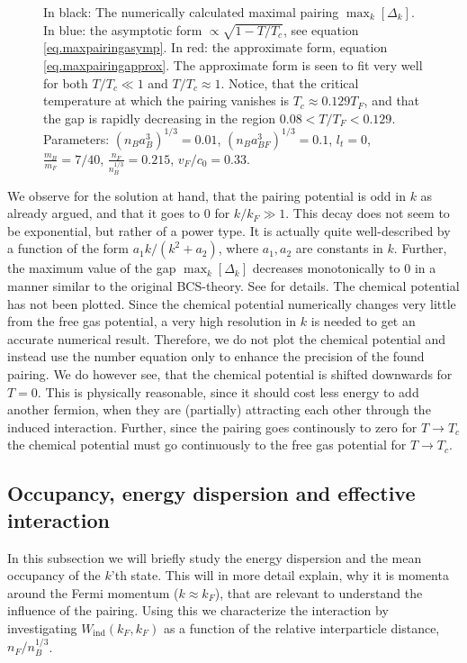 \begin{figure} 
\begin{center}  
  
\caption{In black: The numerically calculated maximal pairing $\max_k[\Delta_k]$. In blue: the asymptotic form $\propto \sqrt{1-T/T_c}$, see equation \eqref{eq.maxpairingasymp}. In red: the approximate form, equation \eqref{eq.maxpairingapprox}. The approximate form is seen to fit very well for both $T/T_c \ll 1$ and $T/T_c \approx 1$. Notice, that the critical temperature at which the pairing vanishes is $T_c \approx 0.129 T_F$, and that the gap is rapidly decreasing in the region $0.08< T/T_F < 0.129$. Parameters: $(n_Ba_B^3)^{1/3} = 0.01$, $(n_Ba_{BF}^3)^{1/3} = 0.1$, $l_t = 0$, $\frac{m_B}{m_F} = 7/40$, $\frac{n_F}{n_B^{1/3}} = 0.215$, $v_F/c_0 = 0.33$. }  
\label{fig.maxkDeltakTdepend}  
\end{center}    
\end{figure}

We observe for the solution at hand, that the pairing potential is odd in $k$ as already argued, and that it goes to 0 for $k/k_F \gg 1$. This decay does not seem to be exponential, but rather of a power type. It is actually quite well-described by a function of the form $a_1k/(k^2 + a_2)$, where $a_1, a_2$ are constants in $k$. Further, the maximum value of the gap $\max_k[\Delta_k]$ decreases monotonically to 0 in a manner similar to the original BCS-theory. See \cite[pp. 63-64]{Tinkham} for details. The chemical potential has not been plotted. Since the chemical potential numerically changes very little from the free gas potential, a very high resolution in $k$ is needed to get an accurate numerical result. Therefore, we do not plot the chemical potential and instead use the number equation only to enhance the precision of the found pairing. We do however see, that the chemical potential is shifted downwards for $T = 0$. This is physically reasonable, since it should cost less energy to add another fermion, when they are (partially) attracting each other through the induced interaction. Further, since the pairing goes continously to zero for $T\to T_c$ the chemical potential must go continuously to the free gas potential for $T\to T_c$. 


\subsection{Occupancy, energy dispersion and effective interaction}
\label{subsec.relevantmomenta.effectiveinteraction}
In this subsection we will briefly study the energy dispersion and the mean occupancy of the $k$'th state. This will in more detail explain, why it is momenta around the Fermi momentum ($k \approx k_F$), that are relevant to understand the influence of the pairing. Using this we characterize the interaction by investigating $W_{\text{ind}}(k_F,k_F)$ as a function of the relative interparticle distance, $n_F / n_B^{1/3}$. 

